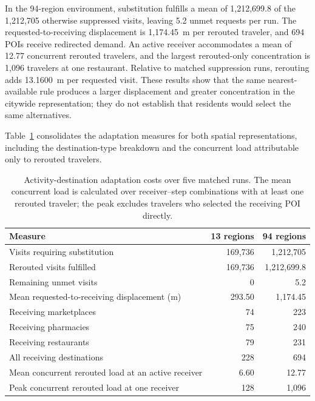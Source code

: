 In the 94-region environment, substitution fulfills a mean of 1,212,699.8 of the 1,212,705 otherwise suppressed visits, leaving 5.2 unmet requests per run. The requested-to-receiving displacement is 1,174.45~m per rerouted traveler, and 694 POIs receive redirected demand. An active receiver accommodates a mean of 12.77 concurrent rerouted travelers, and the largest rerouted-only concentration is 1,096 travelers at one restaurant. Relative to matched suppression runs, rerouting adds 13.1600~m per requested visit. These results show that the same nearest-available rule produces a larger displacement and greater concentration in the citywide representation; they do not establish that residents would select the same alternatives.

Table~\ref{tbl:popular_times_adaptation_cost} consolidates the adaptation measures for both spatial representations, including the destination-type breakdown and the concurrent load attributable only to rerouted travelers.

\begin{table}[ht]
\centering
\footnotesize
\caption{Activity-destination adaptation costs over five matched runs. The mean concurrent load is calculated over receiver--step combinations with at least one rerouted traveler; the peak excludes travelers who selected the receiving POI directly.}
\label{tbl:popular_times_adaptation_cost}
\begin{tabularx}{\linewidth}{@{}Xrr@{}}
\toprule
\textbf{Measure} & \textbf{13 regions} & \textbf{94 regions} \\
\midrule
Visits requiring substitution & 169,736 & 1,212,705 \\
Rerouted visits fulfilled & 169,736 & 1,212,699.8 \\
Remaining unmet visits & 0 & 5.2 \\
Mean requested-to-receiving displacement (m) & 293.50 & 1,174.45 \\
Receiving marketplaces & 74 & 223 \\
Receiving pharmacies & 75 & 240 \\
Receiving restaurants & 79 & 231 \\
All receiving destinations & 228 & 694 \\
Mean concurrent rerouted load at an active receiver & 6.60 & 12.77 \\
Peak concurrent rerouted load at one receiver & 128 & 1,096 \\
\bottomrule
\end{tabularx}
\end{table}

